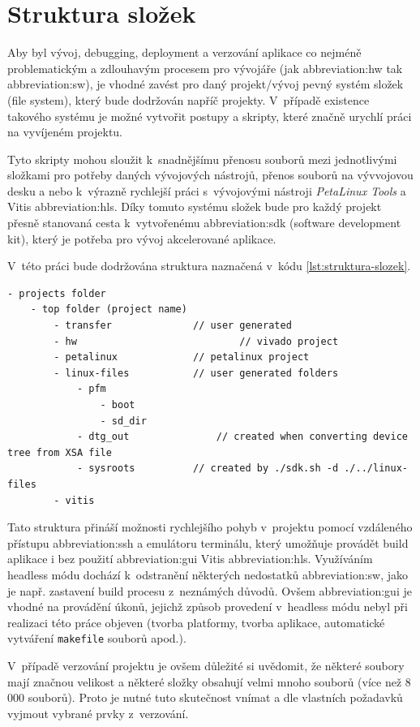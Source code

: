 \documentclass[a4paper, twoside, 11pt]{article}
\begin{document}
	\section{Struktura složek}\label{sec:struktura-slozek}
		Aby byl vývoj, debugging, deployment a verzování aplikace co nejméně problematickým a zdlouhavým procesem pro vývojáře (jak \gls{abbreviation:hw} tak \gls{abbreviation:sw}), je vhodné zavést pro daný projekt/vývoj pevný systém složek (file system), který bude dodržován napříč projekty. V~případě existence takového systému je možné vytvořit postupy a skripty, které značně urychlí práci na vyvíjeném projektu.\par
		Tyto skripty mohou sloužit k~snadnějšímu přenosu souborů mezi jednotlivými složkami pro potřeby daných vývojových nástrojů, přenos souborů na vývvojovou desku a nebo k~výrazně rychlejší práci s~vývojovými nástroji \textit{PetaLinux Tools} a Vitis \gls{abbreviation:hls}. Díky tomuto systému složek bude pro každý projekt přesně stanovaná cesta k~vytvořenému \gls{abbreviation:sdk} (software development kit), který je potřeba pro vývoj akcelerované aplikace.\par
		V~této práci bude dodržována struktura naznačená v~kódu \ref{lst:struktura-slozek}.

		\begin{lstlisting}[language={Text}, caption={Struktura složek, využívaná při tvorbě projektů k~dosažení lepšího DX.}, label= {lst:struktura-slozek}]
- projects folder
	- top folder (project name)
		- transfer				// user generated
		- hw							// vivado project
		- petalinux				// petalinux project
		- linux-files			// user generated folders
			- pfm
				- boot
				- sd_dir
			- dtg_out				// created when converting device tree from XSA file
			- sysroots			// created by ./sdk.sh -d ./../linux-files
		- vitis\end{lstlisting}

		Tato struktura přináší možnosti rychlejšího pohyb v~projektu pomocí vzdáleného přístupu \gls{abbreviation:ssh} a emulátoru terminálu, který umožňuje provádět build aplikace i bez použití \gls{abbreviation:gui} Vitis \gls{abbreviation:hls}. Využíváním headless módu dochází k~odstranění některých nedostatků \gls{abbreviation:sw}, jako je např. zastavení build procesu z~neznámých důvodů. Ovšem \gls{abbreviation:gui} je vhodné na provádění úkonů, jejichž způsob provedení v~headless módu nebyl při realizaci této práce objeven (tvorba platformy, tvorba aplikace, automatické vytváření \texttt{makefile} souborů apod.).\par
		V~případě verzování projektu je ovšem důležité si uvědomit, že některé soubory mají značnou velikost a některé složky obsahují velmi mnoho souborů (více než 8 000 souborů). Proto je nutné tuto skutečnost vnímat a dle vlastních požadavků vyjmout vybrané prvky z~verzování.
		
\end{document}
